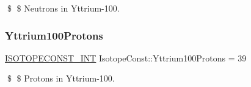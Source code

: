 \$ \$ Neutrons in Yttrium-\/100. \mbox{\label{group___isotope_const-_yttrium-_y100_ga9daeb0b6f7b37ddf890fa050892b2904}} 
\subsubsection{\texorpdfstring{Yttrium100\+Protons}{Yttrium100Protons}}
{\footnotesize\ttfamily \mbox{\hyperlink{group___isotope_const-_macros_ga5f18360b3e99483a35c32d789e62621c}{I\+S\+O\+T\+O\+P\+E\+C\+O\+N\+S\+T\+\_\+\+I\+NT}} Isotope\+Const\+::\+Yttrium100\+Protons = 39}

\$ \$ Protons in Yttrium-\/100. 